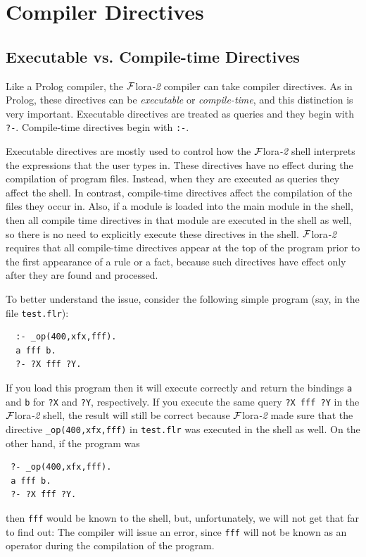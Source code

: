 \documentclass[11pt]{article}
\newcommand{\FLORA}{{\mbox{\sc ${\cal F}${lora}\rm\emph{-2}}}\xspace}
\begin{document}
\section{Compiler Directives}
\label{sec-comp-directives}

%
\subsection{Executable vs. Compile-time Directives}

Like a Prolog compiler, the \FLORA compiler can take compiler directives.
As in Prolog, these directives can be \emph{executable} or
\emph{compile-time}, and this distinction is very important.
Executable directives are treated as queries and they begin with {\tt ?-}.
Compile-time directives begin with {\tt :-}.

Executable directives are mostly used to control how the \FLORA shell
interprets the expressions that the user types in. These directives have no
effect during the compilation of program files. Instead, when they are
executed as queries they affect the shell. In contrast, compile-time
directives affect the compilation of the files they occur in. Also, if a
module is loaded into the main module in the shell, then all compile time
directives in that module are executed in the shell as well, so there is no
need to explicitly execute these directives in the shell.
\FLORA requires
that all compile-time directives appear at the top of the program prior to
the first appearance of a rule or a fact, because such directives have
effect only after they are found and processed.

To better understand the issue, consider the following simple program
(say, in the file {\tt test.flr}):
\begin{verbatim}
  :- _op(400,xfx,fff).
  a fff b.
  ?- ?X fff ?Y.
\end{verbatim}
If you load this program then it will execute correctly and return the
bindings {\tt a} and {\tt b} for {\tt ?X} and {\tt ?Y}, respectively.
If you execute the same query {\tt ?X fff ?Y} in the \FLORA shell,
the result will still be correct because \FLORA made sure that the
directive {\tt \_op(400,xfx,fff)} in
{\tt test.flr} was executed in the shell as well.
On the other hand, if the program was
\begin{verbatim}
 ?- _op(400,xfx,fff).
 a fff b.
 ?- ?X fff ?Y.
\end{verbatim}
then {\tt fff} would be known to the shell, but, unfortunately, we
will not get that far to find out: The compiler will issue an error, since
{\tt fff} will not be known as an operator during the compilation of the
program.
\end{document}
